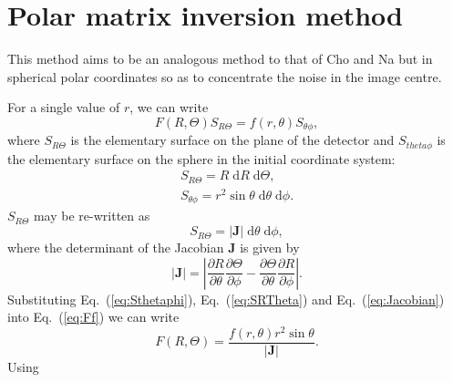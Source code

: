 \documentclass{article}
\renewcommand{\eqref}[1]{Eq.~(\ref{#1})}
\newcommand{\pd}[2]{\ensuremath{\frac{\partial#1}{\partial#2}}}
\newcommand{\dee}{\ensuremath{\mathrm{d}}}
\begin{document}
\section{Polar matrix inversion method}
This method aims to be an analogous method to that of Cho and Na but in
spherical polar coordinates so as to concentrate the noise in the image
centre. 

For a single value of $r$, we can write
\begin{equation}
  \label{eq:Ff}
  F(R, \Theta)S_{R\Theta}=f(r, \theta)S_{\theta\phi},
\end{equation}
where $S_{R\Theta}$ is the elementary surface on the plane of the detector and
$S_{theta\phi}$ is the elementary surface on the sphere in the initial
coordinate system:
\begin{gather}
  S_{R\Theta} = R\;\dee R\;\dee\Theta,\\
  \label{eq:Sthetaphi}
  S_{\theta\phi} = r^2\sin\theta\;\dee\theta\;\dee\phi.
\end{gather}
$S_{R\Theta}$ may be re-written as 
\begin{equation}
  \label{eq:SRTheta}
  S_{R\Theta}=|\mathbf{J}|\;\dee\theta\;\dee\phi,
\end{equation}
where the determinant of the Jacobian $\mathbf{J}$ is given by
\begin{equation}
  \label{eq:Jacobian}
  |\mathbf{J}| = 
  \left|
    \pd{R}{\theta}\pd{\Theta}{\phi}
    -
    \pd{\Theta}{\theta}\pd{R}{\phi}
    \right|.
\end{equation}
Substituting \eqref{eq:Sthetaphi}, \eqref{eq:SRTheta} and \eqref{eq:Jacobian}
into \eqref{eq:Ff} we can write
\begin{equation}
  F(R, \Theta)=
  \frac{f(r,\theta)r^2\sin\theta}{|\mathbf{J}|}.
\end{equation}
Using 
\end{document}
